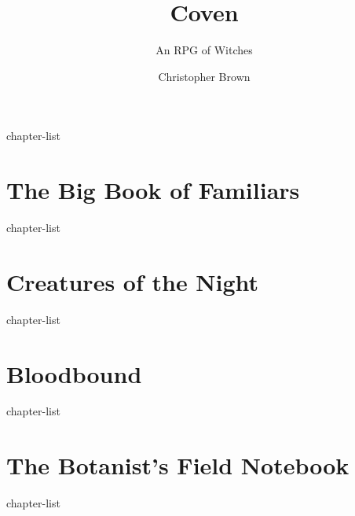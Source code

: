 \documentclass[a4paper,10pt,twocolumn]{memoir}
\title{Coven}
\subtitle{An RPG of Witches}
\author{Christopher Brown}
\begin{document}
\frontmatter

\titlepage



\tableofcontents*

\mainmatter

{chapter-list}

\part{The Big Book of Familiars}
{chapter-list}

\part{Creatures of the Night}
{chapter-list}

\part{Bloodbound}
{chapter-list}

\part{The Botanist's Field Notebook}
{chapter-list}

\backmatter

\printindex
\end{document}
